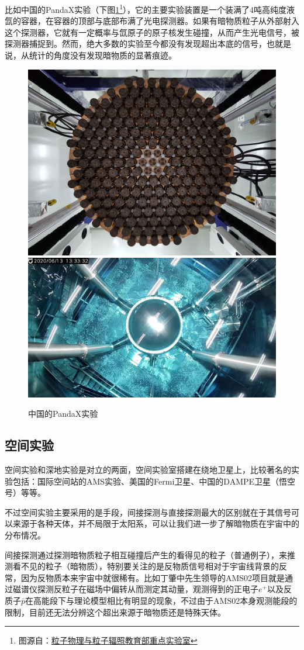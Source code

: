 \documentclass{ctexart}
\newcommand{\dotemph}[1]{\CJKunderdot{#1}}
\begin{document}
	比如中国的PandaX实验（下图\ref{fig:8}\footnote{图源自：\href{http://www.pppi.sdu.edu.cn/info/1041/2937.htm}{粒子物理与粒子辐照教育部重点实验室}}），它的主要实验装置是一个装满了4吨高纯度液氙的容器，在容器的顶部与底部布满了光电探测器。如果有暗物质粒子从外部射入这个探测器，它就有一定概率与氙原子的原子核发生碰撞，从而产生光电信号，被探测器捕捉到。然而，绝大多数的实验至今都没有发现超出本底的信号，也就是说，从统计的角度没有发现暗物质的显著痕迹。
	\begin{figure}[h]
		\centering
		\includegraphics[width=.45\linewidth]{figs/fig8-1.jpg}
		\hspace{.05\linewidth}
		\includegraphics[width=.45\linewidth]{figs/fig8-2.jpg}
		\label{fig:8}
		\caption{中国的PandaX实验}
	\end{figure}
	\subsection{空间实验}
	空间实验和深地实验是对立的两面，空间实验室搭建在绕地卫星上，比较著名的实验包括：国际空间站的AMS实验、美国的Fermi卫星、中国的DAMPE卫星（悟空号）等等。
	
	不过空间实验主要采用的是\dotemph{间接探测}手段，间接探测与直接探测最大的区别就在于其信号可以来源于各种天体，并不局限于太阳系，可以让我们进一步了解暗物质在宇宙中的分布情况。
	
	间接探测通过探测暗物质粒子相互碰撞后产生的看得见的粒子（普通例子），来推测看不见的粒子（暗物质），特别要关注的是反物质信号相对于宇宙线背景的反常，因为反物质本来宇宙中就很稀有。比如丁肇中先生领导的AMS02项目就是通过磁谱仪探测反粒子在磁场中偏转从而测定其动量，观测得到的正电子$e^+$以及反质子$\bar{p}$在高能段下与理论模型相比有明显的\dotemph{超出}现象，不过由于AMS02本身观测能段的限制，目前还无法分辨这个超出来源于暗物质还是特殊天体。
	
\end{document}
